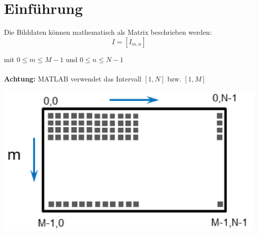 



\chapter{Einführung}

Die Bilddaten können mathematisch als Matrix beschrieben werden:
\[
	I = \left[ I_{m,n} \right] 
\]
\begin{footnotesize}
	mit $0 \leq m \leq M-1$ und $0 \leq n \leq N-1$\\\\
	\textbf{Achtung:} MATLAB verwendet das Intervall $[1,N]$ bzw. $[1,M]$\\
\end{footnotesize}

\begin{center}
\includegraphics[scale=0.7]{../fig/matrix_nomenklatur.png}
\end{center}
~\\\\

